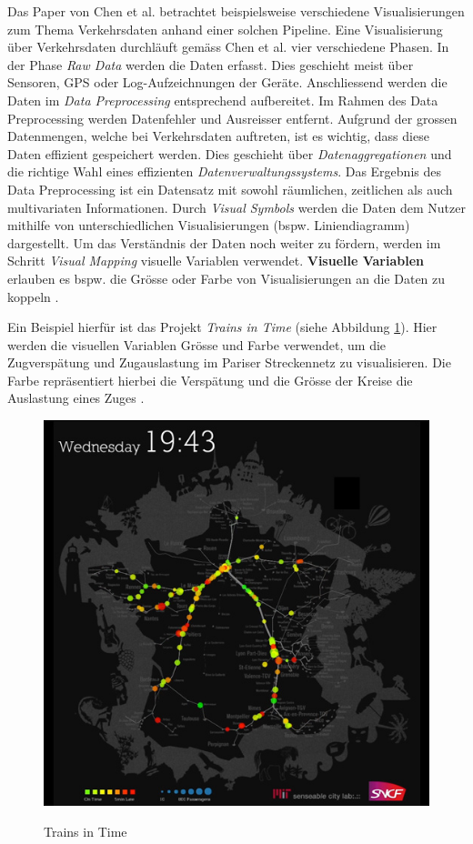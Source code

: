 Das Paper von Chen et al. betrachtet beispielsweise verschiedene Visualisierungen zum Thema Verkehrsdaten anhand einer solchen Pipeline. Eine Visualisierung über Verkehrsdaten durchläuft gemäss Chen et al. vier verschiedene Phasen. In der Phase \textit{Raw Data} werden die Daten erfasst. Dies geschieht meist über Sensoren, GPS oder Log-Aufzeichnungen der Geräte. Anschliessend werden die Daten im \textit{Data Preprocessing} entsprechend aufbereitet. Im Rahmen des Data Preprocessing werden Datenfehler und Ausreisser entfernt. Aufgrund der grossen Datenmengen, welche bei Verkehrsdaten auftreten, ist es wichtig, dass diese Daten effizient gespeichert werden. Dies geschieht über \textit{Datenaggregationen} und die richtige Wahl eines effizienten \textit{Datenverwaltungssystems}. Das Ergebnis des Data Preprocessing ist ein Datensatz mit sowohl räumlichen, zeitlichen als auch multivariaten Informationen. Durch \textit{Visual Symbols} werden die Daten dem Nutzer mithilfe von unterschiedlichen Visualisierungen (bspw. Liniendiagramm) dargestellt. Um das Verständnis der Daten noch weiter zu fördern, werden im Schritt \textit{Visual Mapping} visuelle Variablen verwendet. \textbf{Visuelle Variablen} erlauben es bspw. die Grösse oder Farbe von Visualisierungen an die Daten zu koppeln \parencite[S.2971]{survey_traffic_data_visualization_2015}. 

Ein Beispiel hierfür ist das Projekt \textit{Trains in Time} (siehe Abbildung \ref{fig_trains_in_time}). Hier werden die visuellen Variablen Grösse und Farbe verwendet, um die Zugverspätung und Zugauslastung im Pariser Streckennetz zu visualisieren. Die Farbe repräsentiert hierbei die Verspätung und die Grösse der Kreise die Auslastung eines Zuges \parencite{trains_of_data_2012}.   

\begin{figure}[H]
    \caption{Trains in Time \parencite{trains_of_data_2012}}
    \includegraphics[width=.5\linewidth]{content/00_assets/trains_in_time.jpg}
    \label{fig_trains_in_time}
\end{figure}

